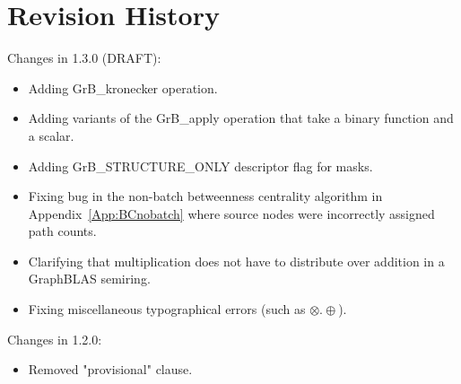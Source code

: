 \chapter{Revision History}
\label{Chp:RevHistory}

Changes in 1.3.0 (DRAFT):
\begin{itemize}
\item Adding {\sf GrB\_kronecker} operation.
\item Adding variants of the {\sf GrB\_apply} operation that take a binary function and a scalar.
\item Adding {\sf GrB\_STRUCTURE\_ONLY} descriptor flag for masks.
\item Fixing bug in the non-batch betweenness centrality algorithm in 
Appendix~\ref{App:BCnobatch} where source nodes were incorrectly assigned path counts.
\item Clarifying that multiplication does not have to distribute over addition in a GraphBLAS semiring.
\item Fixing miscellaneous typographical errors (such as $\otimes.\oplus$).
\end{itemize}


Changes in 1.2.0:
\begin{itemize}
\item Removed "provisional" clause.
\end{itemize}


